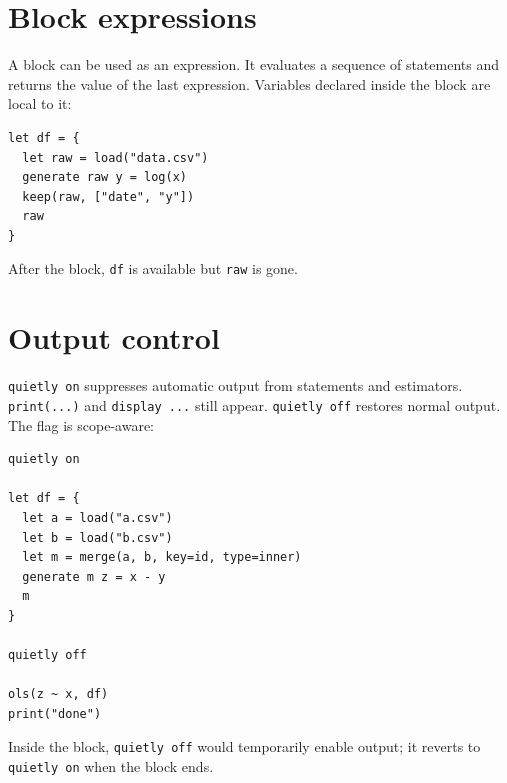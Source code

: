 \section{Block expressions}

A block can be used as an expression. It evaluates a sequence of statements and returns the value of the last expression. Variables declared inside the block are local to it:

\begin{lstlisting}[caption={Block expression returning a value}]
let df = {
  let raw = load("data.csv")
  generate raw y = log(x)
  keep(raw, ["date", "y"])
  raw
}
\end{lstlisting}

After the block, \lstinline{df} is available but \lstinline{raw} is gone.

\section{Output control}

\lstinline{quietly on} suppresses automatic output from statements and estimators. \lstinline{print(...)} and \lstinline{display ...} still appear. \lstinline{quietly off} restores normal output. The flag is scope-aware:

\begin{lstlisting}[caption={quietly on/off with scope}]
quietly on

let df = {
  let a = load("a.csv")
  let b = load("b.csv")
  let m = merge(a, b, key=id, type=inner)
  generate m z = x - y
  m
}

quietly off

ols(z ~ x, df)
print("done")
\end{lstlisting}

Inside the block, \lstinline{quietly off} would temporarily enable output; it reverts to \lstinline{quietly on} when the block ends.
